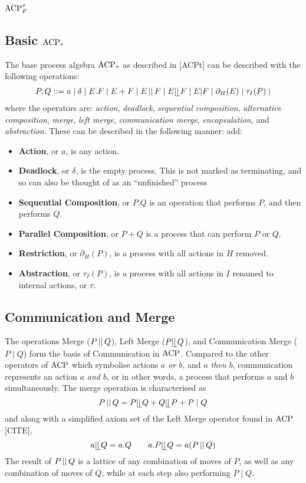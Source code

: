 \documentclass[../hons_project.tex]{subfiles}
\begin{document}
\section{\texorpdfstring{$\acptf$}{ACP-tf}}

\subsection{Basic \texorpdfstring{$\acpt$}{acpt}}
The base process algebra $\acpt$ as described in [ACPt] can be described with the following operations:
\begin{align*}
   P, Q ::= a \mid \delta \mid E . F \mid E + F \mid E \merge F \mid E \leftmerge F \mid E | F \mid \restrict(E) \mid \tau_{I}(P) \mid
\end{align*}
where the operators are: \textit{action}, \textit{deadlock}, \textit{sequential composition}, \textit{alternative composition},  \textit{merge}, \textit{left merge}, \textit{communication merge}, \textit{encapsulation}, and \textit{abstraction}. These can be described in the following manner:
add:\begin{itemize}
   \item \textbf{Action}, or $a$, is any action.
   \item \textbf{Deadlock}, or $\delta$, is the empty process. This is not marked as terminating, and so can also be thought of as an ``unfinished'' process
   \item \textbf{Sequential Composition}, or $P . Q$ is an operation that performs $P$, and then performs $Q$.
   \item \textbf{Parallel Composition}, or $P + Q$ is a process that can perform $P$ or $Q$. 
   \item \textbf{Restriction}, or $\partial_{H}(P)$, is a process with all actions in $H$ removed.
   \item \textbf{Abstraction}, or $\tau_{I}(P)$, is a process with all actions in $I$ renamed to internal actions, or $\tau$.
\end{itemize}

\subsection{Communication and Merge}
The operations Merge ($P \merge Q$), Left Merge ($P \leftmerge Q$), and Communication Merge ($P \mid Q$) form the basis of Communication in $\acp$. Compared to the other operators of $\acp$ which symbolise actions \textit{$a$ or $b$}, and \textit{$a$ then $b$}, communication represents an action \textit{$a$ and $b$}, or in other words, a process that performs $a$ and $b$ simultaneously. The merge operation is characterised as 
\[P \merge Q = P \leftmerge Q + Q \leftmerge P + P \mid Q\]
and along with a simplified axiom set of the Left Merge operator found in $\acp$ [CITE], 
\[a \leftmerge Q = a.Q \qquad a.P \leftmerge Q = a(P \merge Q)\]
The result of $P \merge Q$ is a lattice of any combination of moves of $P$, as well as any combination of moves of $Q$, while at each step also performing $P \mid Q$. 
\end{document}
